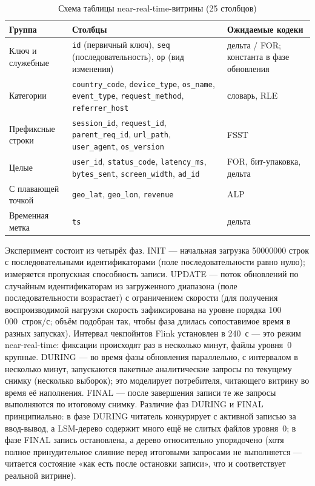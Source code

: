 \begin{table}
    \caption{Схема таблицы near-real-time-витрины (25 столбцов)}
    \label{tab:schema}
    {\small
    \begin{tabularx}{\textwidth}{|>{\raggedright\arraybackslash}p{}|>{\raggedright\arraybackslash}p{}|X|}\hline
    \textbf{Группа} & \textbf{Столбцы} & \textbf{Ожидаемые кодеки} \\ \hline
    Ключ и служебные & \texttt{id} (первичный ключ), \texttt{seq} (последовательность), \texttt{op} (вид изменения) & дельта / FOR; константа в фазе обновления \\ \hline
    Категории & \texttt{country\_code}, \texttt{device\_type}, \texttt{os\_name}, \texttt{event\_type}, \texttt{request\_method}, \texttt{referrer\_host} & словарь, RLE \\ \hline
    Префиксные строки & \texttt{session\_id}, \texttt{request\_id}, \texttt{parent\_req\_id}, \texttt{url\_path}, \texttt{user\_agent}, \texttt{os\_version} & FSST \\ \hline
    Целые & \texttt{user\_id}, \texttt{status\_code}, \texttt{latency\_ms}, \texttt{bytes\_sent}, \texttt{screen\_width}, \texttt{ad\_id} & FOR, бит-упаковка, дельта \\ \hline
    С плавающей точкой & \texttt{geo\_lat}, \texttt{geo\_lon}, \texttt{revenue} & ALP \\ \hline
    Временная метка & \texttt{ts} & дельта \\ \hline
    \end{tabularx}
    }
\end{table}

Эксперимент состоит из четырёх фаз. INIT --- начальная загрузка \num{50000000} строк
с последовательными идентификаторами (поле последовательности равно нулю); измеряется
пропускная способность записи. UPDATE --- поток обновлений по случайным
идентификаторам из загруженного диапазона (поле последовательности возрастает) с
ограничением скорости (для получения воспроизводимой нагрузки скорость зафиксирована
на уровне порядка 100\,000~строк/с; объём подобран так, чтобы фаза длилась
сопоставимое время в разных запусках). Интервал чекпойнтов Flink установлен в
240~с --- это режим near-real-time: фиксации происходят раз в несколько минут,
файлы уровня~0 крупные. DURING --- во время фазы обновления параллельно, с
интервалом в несколько минут, запускаются пакетные аналитические запросы по текущему
снимку (несколько выборок); это моделирует потребителя, читающего витрину во время её
наполнения. FINAL --- после завершения записи те же запросы выполняются по
итоговому снимку. Различие фаз DURING и FINAL принципиально: в фазе DURING читатель
конкурирует с активной записью за ввод-вывод, а LSM-дерево содержит много ещё не
слитых файлов уровня~0; в фазе FINAL запись остановлена, а дерево относительно
упорядочено (хотя полное принудительное слияние перед итоговыми запросами не
выполняется --- читается состояние «как есть после остановки записи», что и
соответствует реальной витрине).

